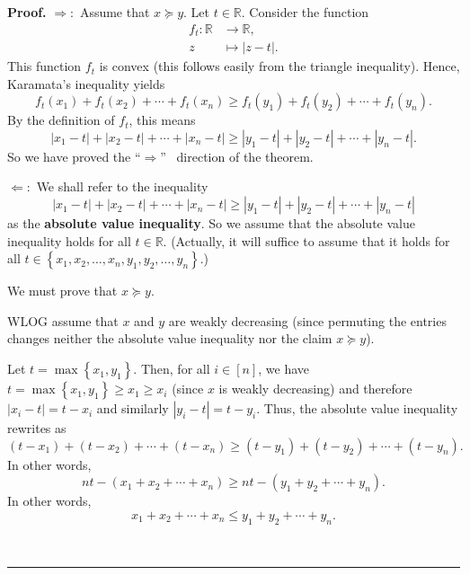 \documentclass[numbers=enddot,12pt,final,onecolumn,notitlepage]{scrartcl}%
\numberwithin{exer}{subsection}
\theoremstyle{definition}
\newenvironment{proof}[1][Proof]{\noindent\textbf{#1.} }{\ \rule{0.5em}{0.5em}}
\begin{document}
\begin{proof}
$\Longrightarrow:$ Assume that $x\succcurlyeq y$. Let $t\in\mathbb{R}$.
Consider the function%
\begin{align*}
f_{t}:\mathbb{R}  & \rightarrow\mathbb{R},\\
z  & \mapsto\left\vert z-t\right\vert .
\end{align*}
This function $f_{t}$ is convex (this follows easily from the triangle
inequality). Hence, Karamata's inequality yields%
\[
f_{t}\left(  x_{1}\right)  +f_{t}\left(  x_{2}\right)  +\cdots+f_{t}\left(
x_{n}\right)  \geq f_{t}\left(  y_{1}\right)  +f_{t}\left(  y_{2}\right)
+\cdots+f_{t}\left(  y_{n}\right)  .
\]
By the definition of $f_{t}$, this means
\[
\left\vert x_{1}-t\right\vert +\left\vert x_{2}-t\right\vert +\cdots
+\left\vert x_{n}-t\right\vert \geq\left\vert y_{1}-t\right\vert +\left\vert
y_{2}-t\right\vert +\cdots+\left\vert y_{n}-t\right\vert .
\]
So we have proved the \textquotedblleft$\Longrightarrow$\textquotedblright%
\ direction of the theorem.

$\Longleftarrow:$ We shall refer to the inequality%
\[
\left\vert x_{1}-t\right\vert +\left\vert x_{2}-t\right\vert +\cdots
+\left\vert x_{n}-t\right\vert \geq\left\vert y_{1}-t\right\vert +\left\vert
y_{2}-t\right\vert +\cdots+\left\vert y_{n}-t\right\vert
\]
as the \textbf{absolute value inequality}. So we assume that the absolute
value inequality holds for all $t\in\mathbb{R}$. (Actually, it will suffice to
assume that it holds for all $t\in\left\{  x_{1},x_{2},\ldots,x_{n}%
,y_{1},y_{2},\ldots,y_{n}\right\}  $.)

We must prove that $x\succcurlyeq y$.

WLOG assume that $x$ and $y$ are weakly decreasing (since permuting the
entries changes neither the absolute value inequality nor the claim
$x\succcurlyeq y$).

Let $t=\max\left\{  x_{1},y_{1}\right\}  $. Then, for all $i\in\left[
n\right]  $, we have $t=\max\left\{  x_{1},y_{1}\right\}  \geq x_{1}\geq
x_{i}$ (since $x$ is weakly decreasing) and therefore $\left\vert
x_{i}-t\right\vert =t-x_{i}$ and similarly $\left\vert y_{i}-t\right\vert
=t-y_{i}$. Thus, the absolute value inequality rewrites as%
\[
\left(  t-x_{1}\right)  +\left(  t-x_{2}\right)  +\cdots+\left(
t-x_{n}\right)  \geq\left(  t-y_{1}\right)  +\left(  t-y_{2}\right)
+\cdots+\left(  t-y_{n}\right)  .
\]
In other words,%
\[
nt-\left(  x_{1}+x_{2}+\cdots+x_{n}\right)  \geq nt-\left(  y_{1}+y_{2}%
+\cdots+y_{n}\right)  .
\]
In other words,%
\[
x_{1}+x_{2}+\cdots+x_{n}\leq y_{1}+y_{2}+\cdots+y_{n}.
\]



\end{proof}
\end{document}
